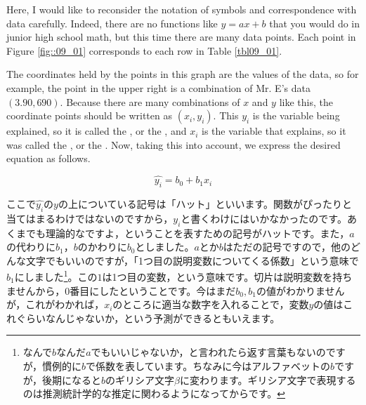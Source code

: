 \documentclass{ltjbook}
\begin{document}
Here, I would like to reconsider the notation of symbols and correspondence with data carefully. Indeed, there are no functions like $y=ax+b$ that you would do in junior high school math, but this time there are many data points. Each point in Figure \ref{fig::09_01} corresponds to each row in Table \ref{tbl09_01}.

The coordinates held by the points in this graph are the values of the data, so for example, the point in the upper right is a combination of Mr. E's data $(3.90, 690)$. Because there are many combinations of $x$ and $y$ like this, the coordinate points should be written as $(x_i, y_i)$. This $y_i$ is the variable being explained, so it is called the , or the  , and $x_i$ is the variable that explains, so it was called the , or the .
Now, taking this into account, we express the desired equation as follows.

\[ \hat{y_i} = b_0 + b_1 x_i \]

ここで$\hat{y_i}$の$y$の上についている記号は「ハット」といいます。関数がぴったりと当てはまるわけではないのですから，$y_i$と書くわけにはいかなかったのです。あくまでも理論的なですよ，ということを表すための記号がハットです。また，$a$の代わりに$b_1$，$b$のかわりに$b_0$としました。$a$とか$b$はただの記号ですので，他のどんな文字でもいいのですが，「1つ目の説明変数についてくる係数」という意味で$b_1$にしました\footnote{なんで$b$なんだ$a$でもいいじゃないか，と言われたら返す言葉もないのですが，慣例的に$b$で係数を表しています。ちなみに今はアルファベットの$b$ですが，後期になると$b$のギリシア文字$\beta$に変わります。ギリシア文字で表現するのは推測統計学的な推定に関わるようになってからです。}。この$1$は1つ目の変数，という意味です。切片は説明変数を持ちませんから，0番目にしたということです。今はまだ$b_0, b_1$の値がわかりませんが，これがわかれば，$x_i$のところに適当な数字を入れることで，変数$y$の値はこれぐらいなんじゃないか，という予測ができるともいえます。
\end{document}
